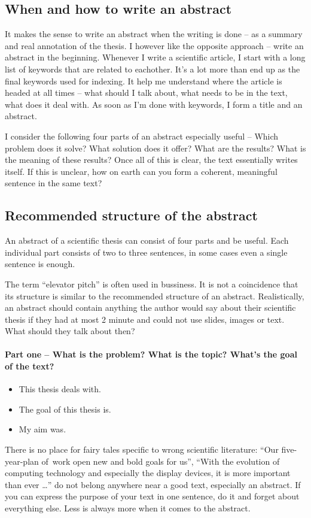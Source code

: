 \subsection*{When and how to write an abstract}
It makes the sense to write an abstract when the writing is done -- as a summary and real annotation of the thesis.
I however like the opposite approach -- write an abstract in the beginning. Whenever I write a scientific article, I start with a long list of keywords that are related to eachother. It's a lot more than end up as the final keywords used for indexing. It help me understand where the article is headed at all times -- what should I talk about, what needs to be in the text, what does it deal with. As soon as I'm done with keywords, I form a title and an abstract.

I consider the following four parts of an abstract especially useful -- Which problem does it solve? What solution does it offer? What are the results? What is the meaning of these results? Once all of this is clear, the text essentially writes itself. If this is unclear, how on earth can you form a coherent, meaningful sentence in the same text?


\subsection*{Recommended structure of the abstract}
An abstract of a scientific thesis can consist of four parts and be useful. Each individual part consists of two to three sentences, in some cases even a single sentence is enough.

The term ``elevator pitch'' is often used in bussiness. It is not a coincidence that its structure is similar to the recommended structure of an abstract. Realistically, an abstract should contain anything the author would say about their scientific thesis if they had at most 2 minute and could not use slides, images or text. What should they talk about then?

\paragraph{Part one -- What is the problem? What is the topic? What's the goal of the text?}
\begin{itemize}
  \item{This thesis deals with.}
  \item{The goal of this thesis is.}
  \item{My aim was.}
\end{itemize}
There is no place for fairy tales specific to wrong scientific literature: ``Our five-year-plan of~work open new and bold goals for us'', ``With the evolution of computing technology and especially the display devices, it is more important than ever \ldots'' do not belong anywhere near a good text, especially an abstract. If you can express the purpose of your text in one sentence, do it and forget about everything else. Less is always more when it comes to the abstract.

